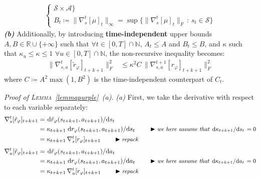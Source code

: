 \begin{lemma}
\begin{align}
\begin{cases}
\mathcal{S} \times \mathcal{A} \big\} \\
B_t \coloneqq \lVert\nabla_s^t[\mu]_t\rVert _\infty
= \sup \big\{\lVert\nabla_s^t[\mu]_t\rVert _F \, : \, s_t \in
\mathcal{S} \big\}
\end{cases}
\end{align}
\textbf{\emph{(b)}} Additionally, by introducing \textbf{time-independent} upper bounds
$A, B \in \mathbb{R} \cup \{+\infty\}$
such that $\forall t \in [0, T] \cap \mathbb{N}$,
$A_t \leq A$ and $B_t \leq B$,
and $\kappa$ such that $\kappa_u \leq \kappa \leq 1$ $\forall u \in [0, T] \cap \mathbb{N}$,
the non-recursive inequality becomes:
\begin{align}
\lVert \nabla_{s,a}^t[\tilde{r}_\varphi]_{t+k+1} \rVert ^2_F
&\leq
\kappa^2
C
\, \lVert \nabla_{s,a}^{t+1}[r_\varphi]_{t+k+1} \rVert ^2_F
\end{align}
where $C \coloneqq A^2 \max(1, B^2)$ is the time-independent counterpart of $C_t$.
\end{lemma}

\emph{Proof of \textsc{Lemma}~\ref{lemmapurple}~\emph{(a)}.}
\emph{(a)} First, we take the derivative with respect to each variable separately:
\begin{align}
\nabla_s^t[\tilde{r}_\varphi]_{t+k+1}
&= \dv*{\tilde{r}_\varphi (s_{t+k+1}, a_{t+k+1})}{s_t} \\
&= \kappa_{t+k+1} \dv*{r_\varphi (s_{t+k+1}, a_{t+k+1})}{s_t}
\qquad
\blacktriangleright\text{\small{\textit{we here assume that $\dv*{\kappa_{t+k+1}}{s_t} = 0$}}} \\
&= \kappa_{t+k+1} \, \nabla_s^t[r_\varphi]_{t+k+1}
\qquad
\blacktriangleright\text{\small{\textit{repack}}}
\end{align}
\begin{align}
\nabla_a^t[\tilde{r}_\varphi]_{t+k+1}
&= \dv*{\tilde{r}_\varphi (s_{t+k+1}, a_{t+k+1})}{a_t} \\
&= \kappa_{t+k+1} \dv*{r_\varphi (s_{t+k+1}, a_{t+k+1})}{a_t}
\qquad
\blacktriangleright\text{\small{\textit{we here assume that $\dv*{\kappa_{t+k+1}}{a_t} = 0$}}} \\
&= \kappa_{t+k+1} \, \nabla_a^t[r_\varphi]_{t+k+1}
\qquad
\blacktriangleright\text{\small{\textit{repack}}}
\end{align}


